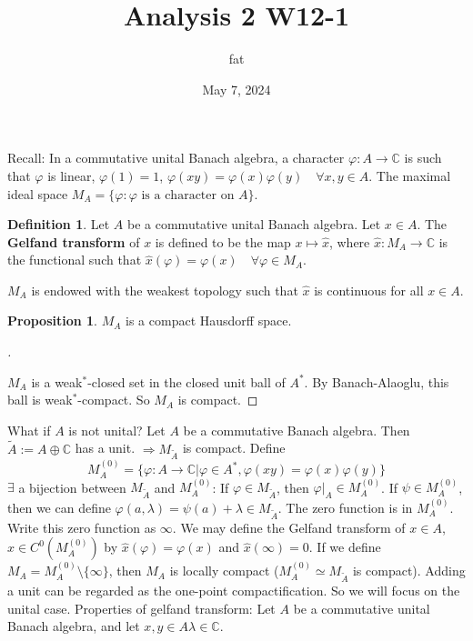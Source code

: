 \documentclass{article}
\title{Analysis 2 W12-1}
\author{fat}
\date{May 7, 2024}
\theoremstyle{definition}
\newtheorem{dfn}{Definition}
\newtheorem{prop}{Proposition}
\newenvironment{proofs}[1][\proofname]{%
  \begin{proof}[#1]$ $\par\nobreak\ignorespaces
}{%
  \end{proof}
}
\newcommand{\CC}{\mathbb C}
\newcommand{\Ra}{\Rightarrow}
\begin{document}
\maketitle
\thispagestyle{fancy}
\renewcommand{\footrulewidth}{0.4pt}
\cfoot{\thepage}
\renewcommand{\headrulewidth}{0.4pt}

Recall: In a commutative unital Banach algebra, a character $\varphi: A \to \CC$ is such that $\varphi$ is linear, $\varphi(1) = 1$, $\varphi(x y) = \varphi(x) \varphi(y) \quad \forall x, y \in A$.
The maximal ideal space $M_A = \{\varphi: \varphi \text{ is a character on }A\}$.

\begin{dfn}
	Let $A$ be a commutative unital Banach algebra.
	Let $x \in A$.
	The \textbf{Gelfand transform} of $x$ is defined to be the map $x \mapsto \widehat{x}$, where $\widehat{x}: M_A \to \CC$ is the functional such that $\widehat{x}(\varphi) = \varphi(x) \quad \forall \varphi \in M_A$.
\end{dfn}

$M_A$ is endowed with the weakest topology such that $\widehat{x}$ is continuous for all $x \in A$.

\begin{prop}
	$M_A$ is a compact Hausdorff space.
\end{prop}

\begin{proofs}
	$M_A$ is a weak$^*$-closed set in the closed unit ball of $A^*$.
	By Banach-Alaoglu, this ball is weak$^*$-compact.
	So $M_A$ is compact.
\end{proofs}

What if $A$ is not unital?
Let $A$ be a commutative Banach algebra.
Then $\tilde{A} := A \oplus \CC$ has a unit.
$\Ra M_{\tilde{A}}$ is compact.
Define
\[
	M_A^{(0)} = \{ \varphi: A \to \CC| \varphi \in A^*, \varphi(x y) = \varphi(x) \varphi(y)\}
\]
$\exists$ a bijection between $M_{\tilde{A}}$ and $M_A^{(0)}$: 
If $\varphi \in M_{\tilde{A}}$, then $\varphi|_A \in M_A^{(0)}$.
If $\psi \in M_A^{(0)}$, then we can define $\varphi(a, \lambda) = \psi(a) + \lambda \in M_{\tilde{A}}$.
The zero function is in $M_A^{(0)}$.
Write this zero function as $\infty$.
We may define the Gelfand transform of $x \in A$, $\widehat{x} \in C^0(M_A^{(0)})$ by $\widehat{x}(\varphi) = \varphi(x)$ and $\widehat{x}(\infty) = 0$.
If we define $M_A = M_A^{(0)} \setminus \{\infty\}$, then $M_A$ is locally compact ($M_A^{(0)} \simeq M_{\tilde{A}}$ is compact).
Adding a unit can be regarded as the one-point compactification.
So we will focus on the unital case.
Properties of gelfand transform:
Let $A$ be a commutative unital Banach algebra, and let $x, y \in A \lambda \in \CC$.
\end{document}
